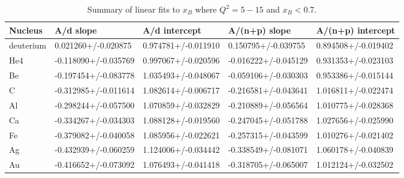 \documentclass[oneside]{article}
\begin{document}
\begin{table}[htb!]
\caption{\label{SlopeFits1} Summary of linear fits to $x_B$ where $Q^2=5-15$ and $x_B<0.7$.}
\centering
\begin{tabular}{ | C{2.5cm} | C{2cm} | C{2cm} | C{2cm} | C{2cm} | }
 \hline
 \textbf{Nucleus} & \textbf{A/d slope} & \textbf{A/d intercept} & \textbf{A/(n+p) slope} & \textbf{A/(n+p) intercept} \\ 
  \hline
deuterium & 0.021260+/-0.020875 &	0.974781+/-0.011910 & 0.150795+/-0.039755	& 0.894508+/-0.019402 \\ 
  \hline
  He4 &-0.118090+/-0.035769 &	0.997067+/-0.020596 & -0.016222+/-0.045129 &	0.931353+/-0.023103 \\ 
 \hline
 Be &-0.197454+/-0.083778 &	1.035493+/-0.048067 &-0.059106+/-0.030303 &	0.953386+/-0.015144\\ 
  \hline
   C &-0.312985+/-0.011614	&1.082614+/-0.006717 & -0.216581+/-0.043641	&1.016811+/-0.022474 \\ 
  \hline
    Al &-0.298244+/-0.057500	&1.070859+/-0.032829 & -0.210889+/-0.056564	&1.010775+/-0.028368 \\ 
  \hline
 Ca &-0.334267+/-0.034303&	1.088128+/-0.019560 & -0.247045+/-0.051788 &	1.027656+/-0.025990 \\ 
  \hline  
  Fe & -0.379082+/-0.040058	&1.085956+/-0.022621& -0.257315+/-0.043599 &	1.010276+/-0.021402 \\ 
  \hline 
  Ag &-0.432939+/-0.060259&	1.124006+/-0.034442 & -0.338549+/-0.081071	&1.060178+/-0.040839 \\ 
  \hline 
   Au & -0.416652+/-0.073092&	1.076493+/-0.041418 & -0.318705+/-0.065007&	1.012124+/-0.032502\\ 
  \hline 
    \end{tabular}
\end{table} 
\end{document}
